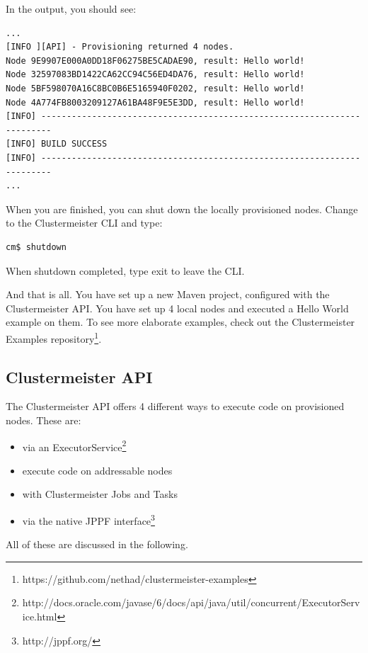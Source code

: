 \documentclass{article}
\begin{document}
In the output, you should see:

\begin{lstlisting}[breaklines=true, backgroundcolor=\color{lbcolor}]
...
[INFO ][API] - Provisioning returned 4 nodes.
Node 9E9907E000A0DD18F06275BE5CADAE90, result: Hello world!
Node 32597083BD1422CA62CC94C56ED4DA76, result: Hello world!
Node 5BF598070A16C8BC0B6E5165940F0202, result: Hello world!
Node 4A774FB8003209127A61BA48F9E5E3DD, result: Hello world!
[INFO] ------------------------------------------------------------------------
[INFO] BUILD SUCCESS
[INFO] ------------------------------------------------------------------------
...
\end{lstlisting}

When you are finished, you can shut down the locally provisioned nodes. Change to the Clustermeister CLI and type:

\begin{lstlisting}[breaklines=true, backgroundcolor=\color{lbcolor}]
cm$ shutdown
\end{lstlisting}

When shutdown completed, type exit to leave the CLI.

And that is all. You have set up a new Maven project, configured with the Clustermeister API. You have set up 4 local nodes and executed a Hello World example on them. To see more elaborate examples, check out the Clustermeister Examples repository\footnote{https://github.com/nethad/clustermeister-examples}.

\subsection{Clustermeister API}

The Clustermeister API offers 4 different ways to execute code on provisioned nodes. These are:

\begin{itemize}
 \item via an ExecutorService\footnote{http://docs.oracle.com/javase/6/docs/api/java/util/concurrent/ExecutorService.html}
 \item execute code on addressable nodes
 \item with Clustermeister Jobs and Tasks
 \item via the native JPPF interface\footnote{http://jppf.org/}
\end{itemize}

All of these are discussed in the following.
\end{document}
